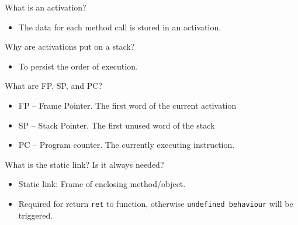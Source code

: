 \documentclass[11pt]{beamer}
\begin{document}
\begin{frame}
\begin{block}{What is an activation?}
\begin{itemize}
\item The data for each method call is stored in an activation.
\end{itemize}
\end{block}

\begin{block}{Why are activations put on a stack?}
\begin{itemize}
\item To persist the order of execution.
\end{itemize}
\end{block}

\begin{block}{What are FP, SP, and PC?}
\begin{itemize}
\item FP – Frame Pointer. The first word of the current activation
\item SP – Stack Pointer. The first unused word of the stack
\item PC – Program counter. The currently executing instruction.
\end{itemize}
\end{block}


\begin{block}{What is the static link? Is it always needed? }
\begin{itemize}
\item Static link: Frame of enclosing method/object.
\item Required for return \texttt{ret} to function, otherwise \texttt{undefined behaviour} will be triggered.
\end{itemize}
\end{block}
\end{frame}
\end{document}
